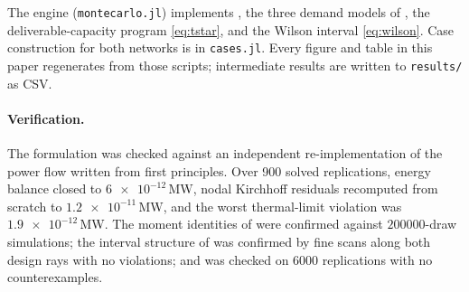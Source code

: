 \documentclass[11pt,a4paper]{article}
\theoremstyle{definition}
\theoremstyle{plain}
\theoremstyle{remark}
\begin{document}
The engine (\texttt{montecarlo.jl}) implements , the three
demand models of , the deliverable-capacity program
\eqref{eq:tstar}, and the Wilson interval \eqref{eq:wilson}. Case construction
for both networks is in \texttt{cases.jl}. Every figure and table in this paper
regenerates from those scripts; intermediate results are written to
\texttt{results/} as CSV.

\paragraph{Verification.} The formulation was checked against an independent
re-implementation of the power flow written from first principles. Over
\num{900} solved replications, energy balance closed to
$\num{6e-12}$\,MW, nodal Kirchhoff residuals recomputed from scratch to
$\num{1.2e-11}$\,MW, and the worst thermal-limit violation was
$\num{1.9e-12}$\,MW. The moment identities of  were
confirmed against $\num{200000}$-draw simulations; the interval structure of
 was confirmed by fine scans along both design rays with no
violations; and  was checked on \num{6000} replications with no
counterexamples.
\end{document}
